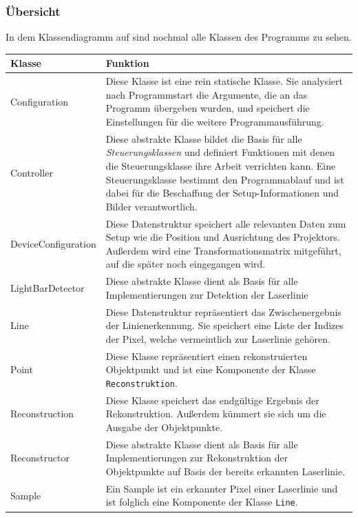\documentclass[ngerman,a4paper,parskip=half]{scrartcl}
\begin{document}
\subsubsection{Übersicht}

In dem Klassendiagramm auf  sind nochmal alle Klassen des Programms zu sehen.

\begin{tabular}{l|p{10cm}}
	\bfseries Klasse    & \bfseries Funktion\\
	\hline
	Configuration       &
		Diese Klasse ist eine rein statische Klasse. Sie analysiert nach Programmstart die Argumente, die an das Programm übergeben wurden, und speichert die Einstellungen für die weitere Programmausführung.\\
	\hline
	Controller          &
		Diese abstrakte Klasse bildet die Basis für alle \emph{Steuerungsklassen} und definiert Funktionen mit denen die Steuerungsklasse ihre Arbeit verrichten kann. Eine Steuerungsklasse bestimmt den Programmablauf und ist dabei für die Beschaffung der Setup-Informationen und Bilder verantwortlich.\\
	\hline
	DeviceConfiguration &
		Diese Datenstruktur speichert alle relevanten Daten zum Setup wie die Position und Ausrichtung des Projektors. Außerdem wird eine Transformationsmatrix mitgeführt, auf die später noch eingegangen wird.\\
	\hline
	LightBarDetector    &
		Diese abstrakte Klasse dient als Basis für alle Implementierungen zur Detektion der Laserlinie\\
	\hline
	Line                &
		Diese Datenstruktur repräsentiert das Zwischenergebnis der Linienerkennung. Sie speichert eine Liste der Indizes der Pixel, welche vermeintlich zur Laserlinie gehören.\\
	\hline
	Point               &
		Diese Klasse repräsentiert einen rekonstruierten Objektpunkt und ist eine Komponente der Klasse \texttt{Reconstruktion}.\\
	\hline
	Reconstruction      &
		Diese Klasse speichert das endgültige Ergebnis der Rekonstruktion. Außerdem kümmert sie sich um die Ausgabe der Objektpunkte.\\
	\hline
	Reconstructor       &
		Diese abstrakte Klasse dient als Basis für alle Implementierungen zur Rekonstruktion der Objektpunkte auf Basis der bereits erkannten Laserlinie.\\
	\hline
	Sample              &
		Ein Sample ist ein erkannter Pixel einer Laserlinie und ist folglich eine Komponente der Klasse \texttt{Line}.\\
	\hline
\end{tabular}
\end{document}
